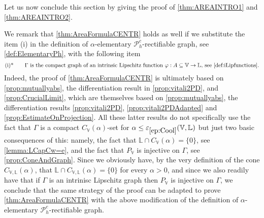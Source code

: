 \documentclass[10pt, a4paper,
oneside, headinclude,footinclude]{scrartcl}
\begin{document}
Let us now conclude this section by giving the proof of \cref{thm:AREAINTRO1} and \cref{thm:AREAINTRO2}.

\begin{osservazione}\label{rem:AncheConIlip}
We remark that \cref{thm:AreaFormulaCENTR} holds as well if we substitute the item (i) in the definition of $\alpha$-elementary $\mathscr{P}_h^c$-rectifiable graph, see \cref{def:ElementaryPh}, with the following item
\begin{equation}
    \text{(i)*\qquad $\Gamma$ is the compact graph of an intrinsic Lipschitz function $\varphi:A\subseteq \mathbb V\to\mathbb L$, see \cref{def:iLipfunctions}.}
\end{equation}
Indeed, the proof of \cref{thm:AreaFormulaCENTR} is ultimately based on \cref{prop:mutuallyabs}, the differentiation result in \cref{prop:vitali2PD}, and \cref{prop:CrucialLimit}, which are themselves based on \cref{prop:mutuallyabs}, the differentiation results \cref{prop:vitali2PD}, \cref{prop:vitali2PDAdapted} and \cref{prop:EstimateOnProjection}. All these latter results do not specifically use the fact that $\Gamma$ is a compact $C_{\mathbb V}(\alpha)$-set for $\alpha\leq\oldep{ep:Cool}(\mathbb V,\mathbb L)$ but just two basic consequences of this: namely, the fact that $\mathbb L\cap C_{\mathbb V}(\alpha)=\{0\}$, see \cref{lemma:LCapCw=e}, and the fact that $P_\mathbb V$ is injective on $\Gamma$, see \cref{prop:ConeAndGraph}. Since we obviously have, by the very definition of the cone $C_{\mathbb V,\mathbb L}(\alpha)$, that $\mathbb L\cap C_{\mathbb V,\mathbb L}(\alpha)=\{0\}$ for every $\alpha>0$, and since we also readily have that if $\Gamma$ is an intrinisc Lipschitz graph then $P_\mathbb V$ is injective on $\Gamma$, we conclude that the same strategy of the proof can be adapted to prove \cref{thm:AreaFormulaCENTR} with the above modification of the definition of $\alpha$-elementary $\mathscr{P}_h^c$-rectifiable graph.
\end{osservazione}
\end{document}
